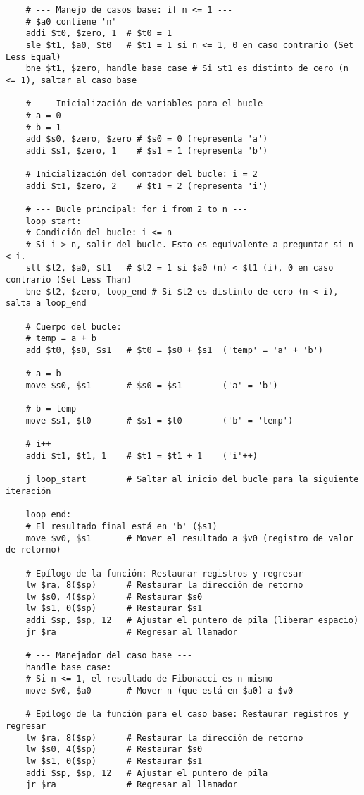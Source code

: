 \documentclass{article}
\begin{document}
\begin{enumerate}
\begin{verbatim}
    # --- Manejo de casos base: if n <= 1 ---
    # $a0 contiene 'n'
    addi $t0, $zero, 1  # $t0 = 1
    sle $t1, $a0, $t0   # $t1 = 1 si n <= 1, 0 en caso contrario (Set Less Equal)
    bne $t1, $zero, handle_base_case # Si $t1 es distinto de cero (n <= 1), saltar al caso base
    
    # --- Inicialización de variables para el bucle ---
    # a = 0
    # b = 1
    add $s0, $zero, $zero # $s0 = 0 (representa 'a')
    addi $s1, $zero, 1    # $s1 = 1 (representa 'b')
    
    # Inicialización del contador del bucle: i = 2
    addi $t1, $zero, 2    # $t1 = 2 (representa 'i')
    
    # --- Bucle principal: for i from 2 to n ---
    loop_start:
    # Condición del bucle: i <= n
    # Si i > n, salir del bucle. Esto es equivalente a preguntar si n < i.
    slt $t2, $a0, $t1   # $t2 = 1 si $a0 (n) < $t1 (i), 0 en caso contrario (Set Less Than)
    bne $t2, $zero, loop_end # Si $t2 es distinto de cero (n < i), salta a loop_end
    
    # Cuerpo del bucle:
    # temp = a + b
    add $t0, $s0, $s1   # $t0 = $s0 + $s1  ('temp' = 'a' + 'b')
    
    # a = b
    move $s0, $s1       # $s0 = $s1        ('a' = 'b')
    
    # b = temp
    move $s1, $t0       # $s1 = $t0        ('b' = 'temp')
    
    # i++
    addi $t1, $t1, 1    # $t1 = $t1 + 1    ('i'++)
    
    j loop_start        # Saltar al inicio del bucle para la siguiente iteración
    
    loop_end:
    # El resultado final está en 'b' ($s1)
    move $v0, $s1       # Mover el resultado a $v0 (registro de valor de retorno)
    
    # Epílogo de la función: Restaurar registros y regresar
    lw $ra, 8($sp)      # Restaurar la dirección de retorno
    lw $s0, 4($sp)      # Restaurar $s0
    lw $s1, 0($sp)      # Restaurar $s1
    addi $sp, $sp, 12   # Ajustar el puntero de pila (liberar espacio)
    jr $ra              # Regresar al llamador
    
    # --- Manejador del caso base ---
    handle_base_case:
    # Si n <= 1, el resultado de Fibonacci es n mismo
    move $v0, $a0       # Mover n (que está en $a0) a $v0
    
    # Epílogo de la función para el caso base: Restaurar registros y regresar
    lw $ra, 8($sp)      # Restaurar la dirección de retorno
    lw $s0, 4($sp)      # Restaurar $s0
    lw $s1, 0($sp)      # Restaurar $s1
    addi $sp, $sp, 12   # Ajustar el puntero de pila
    jr $ra              # Regresar al llamador
   \end{verbatim}


\end{enumerate}
\end{document}
